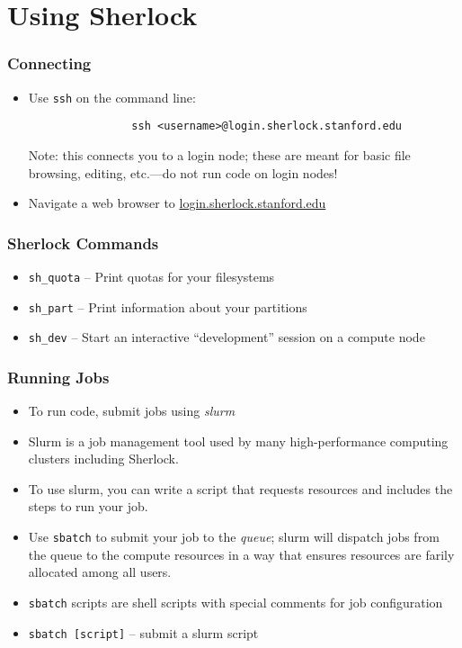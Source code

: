 \documentclass[aspectratio=169]{beamer}
\begin{document}

\section{Using Sherlock}

\frame{\sectionpage}

\begin{frame}[fragile]
	\frametitle{Connecting}
	\begin{itemize}
		\item Use \texttt{ssh} on the command line:
			\begin{verbatim}
				ssh <username>@login.sherlock.stanford.edu
			\end{verbatim}
			Note: this connects you to a login node; these are meant for basic file browsing, editing, etc.---do not run code on login nodes!
		\item Navigate a web browser to \url{login.sherlock.stanford.edu}
	\end{itemize}
\end{frame}

\begin{frame}
	\frametitle{Sherlock Commands}
	\begin{itemize}
		\item \texttt{sh\_quota} -- Print quotas for your filesystems
		\item \texttt{sh\_part} -- Print information about your partitions
		\item \texttt{sh\_dev} -- Start an interactive ``development'' session on a compute node
	\end{itemize}
\end{frame}

\begin{frame}
	\frametitle{Running Jobs}
	\begin{itemize}
		\item To run code, submit jobs using \emph{slurm}
		\item Slurm is a job management tool used by many high-performance computing clusters including Sherlock.
		\item To use slurm, you can write a script that requests resources and includes the steps to run your job.
		\item Use \texttt{sbatch} to submit your job to the \emph{queue}; slurm will dispatch jobs from the queue to the compute resources in a way that ensures resources are farily allocated among all users.
		\item \texttt{sbatch} scripts are shell scripts with special comments for job configuration
		\item \texttt{sbatch [script]} -- submit a slurm script
	\end{itemize}
\end{frame}
\end{document}
